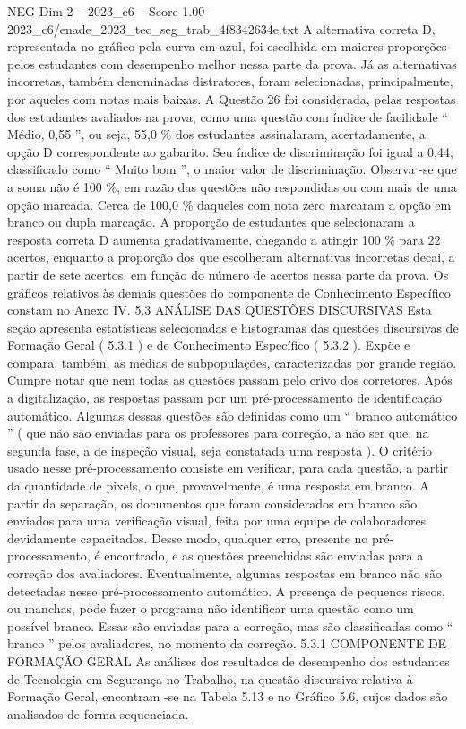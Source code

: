\begin{textsample}{NEG Dim 2 – 2023\_c6 – Score 1.00 – 2023\_c6/enade\_2023\_tec\_seg\_trab\_4f8342634e.txt}
A alternativa correta D, representada no gráfico pela curva em azul, foi escolhida em maiores proporções pelos estudantes com desempenho melhor nessa parte da prova.
Já as alternativas incorretas, também denominadas distratores, foram selecionadas, principalmente, por aqueles com notas mais baixas.
A Questão 26 foi considerada, pelas respostas dos estudantes avaliados na prova, como uma questão com índice de facilidade “ Médio, 0,55 ”, ou seja, 55,0 \% dos estudantes assinalaram, acertadamente, a opção D correspondente ao gabarito.
Seu índice de discriminação foi igual a 0,44, classificado como “ Muito bom ”, o maior valor de discriminação.
Observa -se que a soma não é 100 \%, em razão das questões não respondidas ou com mais de uma opção marcada.
Cerca de 100,0 \% daqueles com nota zero marcaram a opção em branco ou dupla marcação.
A proporção de estudantes que selecionaram a resposta correta D aumenta gradativamente, chegando a atingir 100 \% para 22 acertos, enquanto a proporção dos que escolheram alternativas incorretas decai, a partir de sete acertos, em função do número de acertos nessa parte da prova.
Os gráficos relativos às demais questões do componente de Conhecimento Específico constam no Anexo IV. 5.3 ANÁLISE DAS QUESTÕES DISCURSIVAS Esta seção apresenta estatísticas selecionadas e histogramas das questões discursivas de Formação Geral ( 5.3.1 ) e de Conhecimento Específico ( 5.3.2 ).
Expõe e compara, também, as médias de subpopulações, caracterizadas por grande região.
Cumpre notar que nem todas as questões passam pelo crivo dos corretores.
Após a digitalização, as respostas passam por um pré-processamento de identificação automático.
Algumas dessas questões são definidas como um “ branco automático ” ( que não são enviadas para os professores para correção, a não ser que, na segunda fase, a de inspeção visual, seja constatada uma resposta ).
O critério usado nesse pré-processamento consiste em verificar, para cada questão, a partir da quantidade de pixels, o que, provavelmente, é uma resposta em branco.
A partir da separação, os documentos que foram considerados em branco são enviados para uma verificação visual, feita por uma equipe de colaboradores devidamente capacitados.
Desse modo, qualquer erro, presente no pré-processamento, é encontrado, e as questões preenchidas são enviadas para a correção dos avaliadores.
Eventualmente, algumas respostas em branco não são detectadas nesse pré-processamento automático.
A presença de pequenos riscos, ou manchas, pode fazer o programa não identificar uma questão como um possível branco.
Essas são enviadas para a correção, mas são classificadas como “ branco ” pelos avaliadores, no momento da correção. 5.3.1 COMPONENTE DE FORMAÇÃO GERAL As análises dos resultados de desempenho dos estudantes de Tecnologia em Segurança no Trabalho, na questão discursiva relativa à Formação Geral, encontram -se na Tabela 5.13 e no Gráfico 5.6, cujos dados são analisados de forma sequenciada.

\end{textsample}
